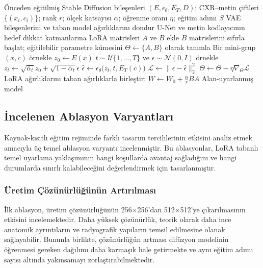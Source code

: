 \documentclass[11pt]{article}
\begin{document}
\begin{algorithm}[htbp]
\caption{LoRA ile kaynak-verimli CXR alan uyarlaması}
\label{alg:lora}
\begin{algorithmic}[1]
\Require Önceden eğitilmiş Stable Diffusion bileşenleri $(E,\epsilon_\theta,E_T,D)$;
CXR--metin çiftleri $\{(x_i,c_i)\}$; rank $r$; ölçek katsayısı $\alpha$;
öğrenme oranı $\eta$; eğitim adımı $S$
\State VAE bileşenlerini ve taban model ağırlıklarını dondur
\State U-Net ve metin kodlayıcının hedef dikkat katmanlarına LoRA matrisleri
$A$ ve $B$ ekle
\State $B$ matrislerini sıfırla başlat; eğitilebilir parametre kümesini
$\Theta \gets \{A,B\}$ olarak tanımla
    \State Bir mini-grup $(x,c)$ örnekle
    \State $z_0 \gets E(x)$
    \State $t \sim \mathcal{U}\{1,\dots,T\}$ ve
    $\epsilon \sim \mathcal{N}(0,I)$ örnekle
    \State $z_t \gets \sqrt{\bar\alpha_t}z_0 +
    \sqrt{1-\bar\alpha_t}\epsilon$
    \State $\hat{\epsilon} \gets
    \epsilon_\theta\big(z_t,t,E_T(c)\big)$
    \State $\mathcal{L} \gets \|\epsilon-\hat{\epsilon}\|_2^2$
    \State $\Theta \gets \Theta - \eta \nabla_\Theta \mathcal{L}$
\EndFor
\State LoRA ağırlıklarını taban ağırlıklarla birleştir:
$W \leftarrow W_0 + \frac{\alpha}{r}BA$
\State \Return Alan-uyarlanmış model
\end{algorithmic}
\end{algorithm}

\subsection{İncelenen Ablasyon Varyantları}

Kaynak-kısıtlı eğitim rejiminde farklı tasarım tercihlerinin etkisini analiz
etmek amacıyla üç temel ablasyon varyantı incelenmiştir. Bu ablasyonlar,
LoRA tabanlı temel uyarlama yaklaşımının hangi koşullarda avantaj sağladığını
ve hangi durumlarda sınırlı kalabileceğini değerlendirmek için tasarlanmıştır.

\subsubsection{Üretim Çözünürlüğünün Artırılması}

İlk ablasyon, üretim çözünürlüğünün 256$\times$256'dan 512$\times$512'ye
çıkarılmasının etkisini incelemektedir. Daha yüksek çözünürlük, teorik olarak
daha ince anatomik ayrıntıların ve radyografik yapıların temsil edilmesine
olanak sağlayabilir. Bununla birlikte, çözünürlüğün artması difüzyon modelinin
öğrenmesi gereken dağılımı daha karmaşık hale getirmekte ve aynı eğitim adımı
sayısı altında yakınsamayı zorlaştırabilmektedir.
\end{document}
